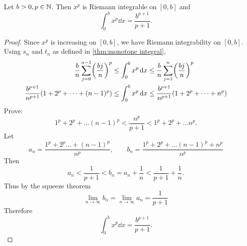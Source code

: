 \begin{example}
    Let $b > 0, p \in \mathbb{N}$. Then $x^{p}$ is Riemann integrable on $[0, b]$ and \[
        \int_{0}^{b} x^{p} \dd x = \frac{b^{p+1}}{p+1}.
    \]
\end{example}
\begin{proof}
    Since $x^{p}$ is increasing on $[0, b]$, we have Riemann integrability on $[0, b]$. Using $s_{n}$ and $t_{n}$ as defined in \cref{thm:monotone integral}, \begin{align*}
        \frac{b}{n} \sum_{j=0}^{n-1} \paren{\frac{bj}{n}}^{p} &\leq \int_{0}^{b} x^{p} \dd x \leq \frac{b}{n} \sum_{j=1}^{n} \paren{\frac{bj}{n}}^{p} \\
        \frac{b^{p+1}}{n^{p+1}} \paren{1 + 2^{p} + \dots + (n-1)^{p}} &\leq \int_{0}^{b} x^{p} \dd x \leq \frac{b^{p+1}}{n^{p+1}} \paren{1 + 2^{p} + \dots + n^{p}} 
    \end{align*}
    \textcolor{exercise}{Prove:} \[
        1^{p} + 2^{p} + \dots (n-1)^{p} < \frac{n^{p}}{p + 1} < 1^{p} + 2^{p} + \dots n^{p}.
    \]
    Let \[
        a_{n} = \frac{1^{p} + 2^{p} \dots + (n-1)^{p}}{n^{p}}, \qquad b_{n} = \frac{1^{p} + 2^{p} + \dots (n-1)^{p} + n^{p}}{n^{p}}
    \] Then \[
        a_{n} < \frac{1}{p + 1} < b_{n} = a_{n} + \frac{1}{n} < \frac{1}{p + 1} + \frac{1}{n}.
    \] Thus by the squeeze theorem \[
        \lim_{n \to \infty} b_{n} = \lim_{n \to \infty} a_{n} = \frac{1}{p + 1}
    \] Therefore \[
        \int_{0}^{b} x^{p} \dd x = \frac{b^{p+1}}{p+1}.
    \]
\end{proof}




